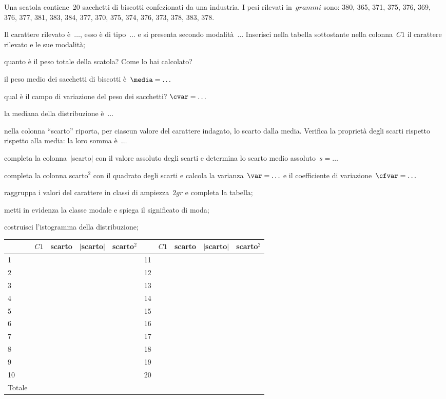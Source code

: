 \begin{esercizio}
\label{ese:A.46}
Una scatola contiene~20 sacchetti di biscotti confezionati da una 
industria. I pesi rilevati in~\(\unit{grammi}\) sono:
380, 365, 371, 375, 376, 369, 376, 377, 381, 383, 384, 377, 370, 375, 374, 
376, 373, 378, 383, 378.
\begin{enumeratea}
 \item Il carattere rilevato è~\(\ldots\), esso è di tipo~\(\ldots\) e si 
presenta secondo modalità~\(\ldots\)
 Inserisci nella tabella sottostante nella colonna~\(C1\) il carattere 
rilevato e le sue modalità;
 \item quanto è il peso totale della scatola? Come lo hai calcolato?
 \item il peso medio dei sacchetti di biscotti è~\(\media = \ldots\)
 \item qual è il campo di variazione del peso dei sacchetti? \(\cvar = 
\ldots\)
 \item la mediana della distribuzione è~\(\ldots\)
 \item nella colonna ``scarto'' riporta, per ciascun valore del carattere 
indagato, lo scarto dalla media.
 Verifica la proprietà degli scarti rispetto rispetto alla media: la loro 
somma è~\(\ldots\)
 \item completa la colonna~\(\vert\)scarto\(\vert\) con il valore assoluto 
degli scarti e determina lo scarto medio assoluto~\(s = \dots\)
 \item completa la colonna scarto\(^2\) con il quadrato degli scarti e 
calcola la varianza~\(\var = \ldots\) e
 il coefficiente di variazione~\(\cfvar = \ldots\)
 \item raggruppa i valori del carattere in classi di ampiezza~\(2 \unit{gr}\) 
e completa la tabella;
 \item metti in evidenza la classe modale e spiega il significato di moda;
 \item costruisci l'istogramma della distribuzione;

\begin{center}
\begin{tabular}{*{2}{lcccc}}
\toprule
 & \(C1\) & scarto &\(\vert\)scarto\(\vert\) &scarto\(^2\)& & \(C1\) & scarto 
&\(\vert\)scarto\(\vert\) &scarto\(^2\)\\
\midrule
1 & & & & &11 & & & &\\
2 & & & & &12 & & & &\\
3 & & & & &13 & & & &\\
4 & & & & &14 & & & &\\
5 & & & & &15 & & & &\\
6 & & & & &16 & & & &\\
7 & & & & &17 & & & &\\
8 & & & & &18 & & & &\\
9 & & & & &19 & & & &\\
10 & & & & &20 & & & &\\
\midrule
Totale & & & &&&&\\
\bottomrule
\end{tabular}
\end{center}

\end{enumeratea}
\end{esercizio}

